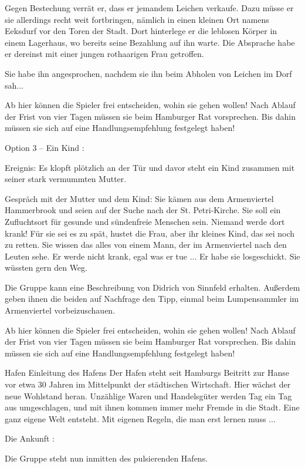 Gegen Bestechung verrät er, dass er jemandem Leichen verkaufe. Dazu müsse er sie allerdings recht weit fortbringen, nämlich in einen kleinen Ort namens Eeksdurf vor den Toren der Stadt. Dort hinterlege er die leblosen Körper in einem Lagerhaus, wo bereits seine Bezahlung auf ihn warte. Die Absprache habe er dereinst mit einer jungen rothaarigen Frau getroffen.

Sie habe ihn angesprochen, nachdem sie ihn beim Abholen von Leichen im Dorf sah...


Ab hier können die Spieler frei entscheiden, wohin sie gehen wollen! Nach Ablauf der Frist von vier Tagen müssen sie beim Hamburger Rat vorsprechen. Bis dahin müssen sie sich auf eine Handlungsempfehlung festgelegt haben!


Option 3 – Ein Kind
:

Ereignis: Es klopft plötzlich an der Tür und davor steht ein Kind zusammen mit seiner stark vermummten Mutter.

Gespräch mit der Mutter und dem Kind: Sie kämen aus dem Armenviertel Hammerbrook und seien auf der Suche nach der St. Petri-Kirche. Sie soll ein Zufluchtsort für gesunde und sündenfreie Menschen sein. Niemand werde dort krank! Für sie sei es zu spät, hustet die Frau, aber ihr kleines Kind, das sei noch zu retten. Sie wissen das alles von einem Mann, der im Armenviertel nach den Leuten sehe. Er werde nicht krank, egal was er tue ... Er habe sie losgeschickt. Sie wüssten gern den Weg.

Die Gruppe kann eine Beschreibung von Didrich von Sinnfeld erhalten. Außerdem geben ihnen die beiden auf Nachfrage den Tipp, einmal beim Lumpensammler im Armenviertel vorbeizuschauen.


Ab hier können die Spieler frei entscheiden, wohin sie gehen wollen! Nach Ablauf der Frist von vier Tagen müssen sie beim Hamburger Rat vorsprechen. Bis dahin müssen sie sich auf eine Handlungsempfehlung festgelegt haben!


Hafen
Einleitung des Hafens
Der Hafen steht seit Hamburgs Beitritt zur Hanse vor etwa 30 Jahren im Mittelpunkt der städtischen Wirtschaft. Hier wächst der neue Wohlstand heran. Unzählige Waren und Handelsgüter werden Tag ein Tag aus umgeschlagen, und mit ihnen kommen immer mehr Fremde in die Stadt. Eine ganz eigene Welt entsteht. Mit eigenen Regeln, die man erst lernen muss ...

Die Ankunft
:

Die Gruppe steht nun inmitten des pulsierenden Hafens.

